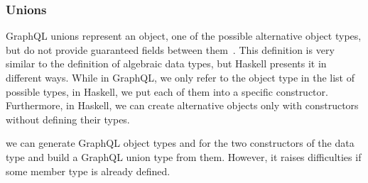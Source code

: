 \begin{frame}\frametitle{Unions}
GraphQL unions represent an object, one of the possible alternative object types, but do not provide guaranteed fields between them~\cite{gql-spec}.
This definition is very similar to the definition of algebraic data types, but Haskell presents it in different ways. While in GraphQL, we only refer to the object type in the list of possible types, in Haskell, we put each of them into a specific constructor. Furthermore, in Haskell, we can create alternative objects only with constructors without defining their types.

we can generate GraphQL object types  and  for the two constructors of the data type  and build a GraphQL union type from them. However, it raises difficulties if some member type is already defined.








\end{frame}
